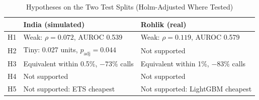 \documentclass[conference]{IEEEtran}
\begin{document}
\begin{table}[t]
\caption{Hypotheses on the Two Test Splits (Holm-Adjusted Where Tested)}
\label{tab:hyp}
\centering
\footnotesize
\begin{tabularx}{\columnwidth}{@{}lXX@{}}
\toprule
 & India (simulated) & Rohlik (real) \\
\midrule
H1 & Weak: $\rho=0.072$, AUROC 0.539 & Weak: $\rho=0.119$, AUROC 0.579 \\
H2 & Tiny: 0.027 units, $p_{\mathrm{adj}}=0.044$ & Not supported \\
H3 & Equivalent within 0.5\%, $-73\%$ calls & Equivalent within 1\%, $-83\%$ calls \\
H4 & Not supported & Not supported \\
H5 & Not supported: ETS cheapest & Not supported: LightGBM cheapest \\
\bottomrule
\end{tabularx}
\end{table}
\end{document}
